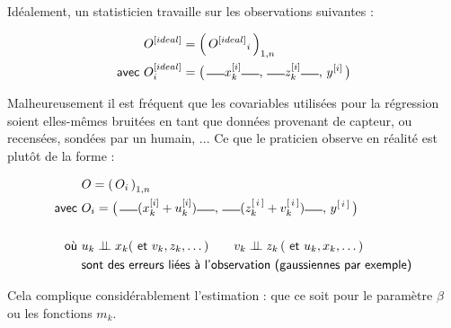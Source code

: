 Idéalement, un statisticien travaille sur les observations suivantes :

\begin{align}
	               & O^{[ideal]} = \famfinie {O^{[ideal]}} 1 n
	\notag
	\\
	\textsf{avec } & O_i^{[ideal]} = \bigl( \, \dash x_k^{[i]} \dash, \, \dash z_k^{[i]} \dash, \, y^{[i]} \, \bigr)
\end{align}

Malheureusement il est fréquent que les covariables utilisées pour la régression soient elles-mêmes bruitées en tant que données provenant de capteur, ou recensées, sondées par un humain, ... Ce que le praticien observe en réalité est plutôt de la forme :

\begin{align}
	               & O = \famfinie O 1 n
	\notag
	\\
	\textsf{avec } & O_i = \bigl( \, \dash (x_k^{[i]} + u^{[i]}_k) \dash, \, \dash (z_k^{[\,i\,]} + v_k^{[\,i\,]}) \dash, \, y^{[\,i\,]} \, \bigr)
	\\
	\notag
	\\
	\textsf{où }   & u_k \indep x_k (\textsf{ et } v_k, z_k, \dots) \qquad v_k \indep z_k \, (\textsf{ et } u_k, x_k, \dots)
	\notag
	\\
	               & \textsf{sont des erreurs liées à l'observation (gaussiennes par exemple)}
	\notag
\end{align}


\noindent Cela complique considérablement l'estimation : que ce soit pour le paramètre $\beta$ ou les fonctions $m_k$.

\smallskip

